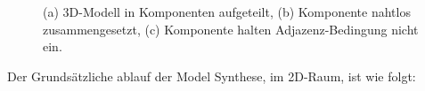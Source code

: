 \documentclass[12pt, a4paper,twoside,openright]{report} %
\begin{document}
\begin{figure}[H]
    \centering
    \qquad
    \qquad
    \caption{(a) 3D-Modell in Komponenten aufgeteilt, (b) Komponente nahtlos zusammengesetzt, (c) Komponente halten Adjazenz-Bedingung nicht ein. \cite{merrell2009model}}%
\end{figure}

Der Grundsätzliche ablauf der Model Synthese, im 2D-Raum, ist wie folgt:
\end{document}
